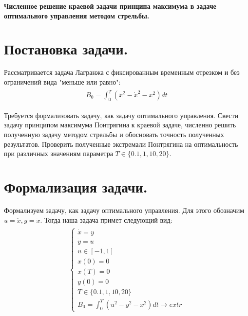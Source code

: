 \documentclass[a4paper,12pt]{article}
\begin{document}
\begin{center}
\textbf{
Численное решение краевой задачи принципа максимума в задаче оптимального управления методом стрельбы.
}
\end{center}





\section{Постановка задачи.}
Рассматривается задача Лагранжа с фиксированным временным отрезком и без ограничений вида "меньше или равно":
\begin{align}
\begin{align*}
    B_0=\int_0^T({\ddot x}^2-{\dot x}^2-x^2)dt
\end{align*}
\end{align}

Требуется формализовать задачу, как задачу оптимального управления. Свести задачу принципом максимума Понтрягина к краевой задаче, численно решить полученную задачу методом стрельбы и обосновать точность полученных результатов. Проверить полученные экстремали Понтрягина на оптимальность при различных значениям параметра $T \in \{0.1,1,10,20\}.$


\section{Формализация задачи.}
Формализуем задачу, как задачу оптимального управления. Для этого обозначим $u= \ddot x, y=\dot x $. Тогда наша задача примет следующий вид:
\begin{align}
\begin{align*}
    \left\{
        \begin{array}{l}
            {\dot x}=y
            \\
            {\dot y}=u
            \\
            u \in \left[-1,1\right]
            \\
            x(0)=0
            \\
            x(T)=0
            \\
            y(0)=0
            \\
            T \in \{0.1,1,10,20\}
            \\
            B_0=\int_0^T(u^2-y^2-x^2)dt \longrightarrow extr
        \end{array}
    \right. 
\end{align*}
\end{align}
\end{document}

